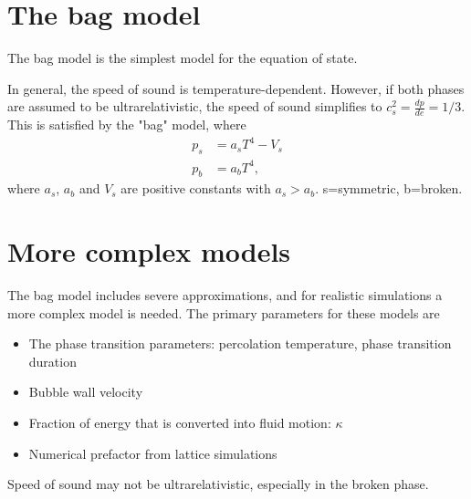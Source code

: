 \section{The bag model}
The bag model is the simplest model for the equation of state.

In general, the speed of sound is temperature-dependent.
However, if both phases are assumed to be ultrarelativistic, the speed of sound simplifies to $c_s^2 = \frac{dp}{de} = 1/3$.
This is satisfied by the "bag" model, where
\cites[eq. 7.33]{lecture_notes}[eq. 8-9]{giese_2020}
\begin{align}
p_s &= a_s T^4 - V_s
\label{eq:bag_ps} \\
p_b &= a_b T^4,
\label{eq:bag_pb}
\end{align}
where $a_s$, $a_b$ and $V_s$ are positive constants with $a_s > a_b$.
s=symmetric, b=broken.


\section{More complex models}
The bag model includes severe approximations, and for realistic simulations a more complex model is needed.
The primary parameters for these models are
\begin{itemize}
    \item The phase transition parameters: percolation temperature, phase transition duration
    \item Bubble wall velocity
    \item Fraction of energy that is converted into fluid motion: $\kappa$
    \item Numerical prefactor from lattice simulations
\end{itemize}

Speed of sound may not be ultrarelativistic, especially in the broken phase.

